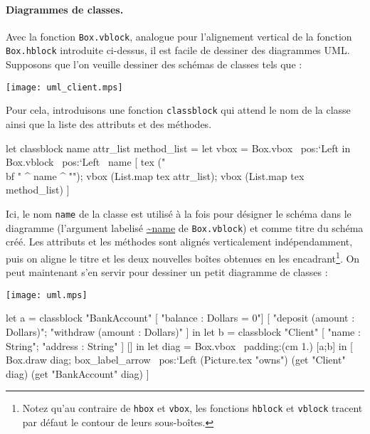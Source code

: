 \documentclass[twoside]{studia-Hermann}
\begin{document}

\paragraph{Diagrammes de classes.}
Avec la fonction \texttt{Box.vblock}, analogue pour l'alignement
vertical de la fonction
\texttt{Box.hblock} introduite ci-dessus, il est facile
de dessiner des diagrammes UML. Supposons que l'on veuille dessiner
des schémas de classes tels que :
\begin{center}
  \texttt{[image: uml\_client.mps]}
\end{center}
Pour cela, introduisons une fonction \texttt{classblock} qui attend le
nom de la classe ainsi que la liste des attributs et des méthodes. 
\begin{ocaml}
let classblock name attr_list method_list = 
  let vbox = Box.vbox ~pos:`Left in
  Box.vblock ~pos:`Left ~name
  [ tex ("{\\bf " ^ name ^ "}");
    vbox (List.map tex attr_list); vbox (List.map tex method_list) ]
\end{ocaml}
Ici, le nom \texttt{name} de la classe est utilisé à la fois pour
désigner le schéma dans le diagramme (l'argument labelisé \url{~name}
de \texttt{Box.vblock}) et comme titre du schéma créé. Les attributs
et les méthodes sont alignés verticalement indépendamment, puis on
aligne le titre et les deux nouvelles boîtes obtenues en les
encadrant\footnote{Notez qu'au contraire de {\tt hbox} et {\tt vbox}, les
fonctions {\tt hblock} et {\tt vblock} tracent par défaut le contour
de leurs sous-boîtes.}.  On peut maintenant s'en servir pour dessiner un
petit diagramme de classes :

\medskip
\begin{minipage}{0.35\linewidth}
  \texttt{[image: uml.mps]}
\end{minipage}
\begin{minipage}{0.6\linewidth}
\small\begin{ocaml}
let a = classblock "BankAccount" 
          [ "balance : Dollars = $0$"] 
          [ "deposit (amount : Dollars)"; 
            "withdraw (amount : Dollars)" ] in
let b = classblock "Client" 
          [ "name : String"; "address : String" ] [] in
let diag = Box.vbox ~padding:(cm 1.) [a;b] in
[ Box.draw diag; 
  box_label_arrow ~pos:`Left (Picture.tex "owns") 
    (get "Client" diag) (get "BankAccount" diag) ]
\end{ocaml}
\end{minipage}
\vspace{1em}
\end{document}
